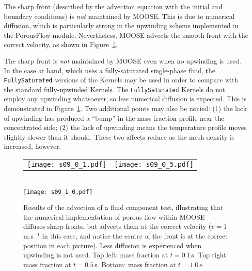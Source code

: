The sharp front (described by the advection equation
with the initial and boundary conditions) is {\em not} maintained by
MOOSE.  This is due to numerical diffusion, which is particularly
strong in the upwinding scheme implemented in the PorousFlow module.
Nevertheless, MOOSE advects the smooth front with the correct
velocity, as shown in Figure~\ref{s09.fig}.

The sharp front is {\em not} maintained by MOOSE even when no
upwinding is used.  In the case at hand, which uses a fully-saturated
single-phase fluid, the {\tt FullySaturated} versions of the Kernels
may be used in order to compare with the standard fully-upwinded
Kernels.  The {\tt FullySaturated} Kernels do not employ any upwinding
whatsoever, so less numerical
diffusion is expected.  This is demonstrated in
Figure~\ref{s09.fig}.  Two additional points may also be
nocied: (1) the lack of upwinding has produced a ``bump'' in the
mass-fraction profile near the concentrated side; (2) the lack of upwinding
means the temperature profile moves slightly slower than it should.
These two affects reduce as the mesh density is increased, however.

\begin{figure}[htb]
\begin{center}
\begin{tabular}{cc}
\texttt{[image: s09\_0\_1.pdf]}  &
\texttt{[image: s09\_0\_5.pdf]}
\end{tabular} \\
\texttt{[image: s09\_1\_0.pdf]}
\caption{Results of the advection of a fluid component test,
  illustrating that the numerical implementation of porous flow within
  MOOSE diffuses sharp fronts, but advects them at the correct
  velocity ($v=1$\,m.s$^{-1}$ in this case, and notice the centre of
  the front is at the correct position in each picture).  Less
  diffusion is experienced when upwinding is not used.  Top left: mass
  fraction at $t=0.1$\,s.  Top right: mass fraction at $t=0.5$\,s.
  Bottom: mass fraction at $t=1.0$\,s.}
\label{s09.fig}
\end{center}
\end{figure}
